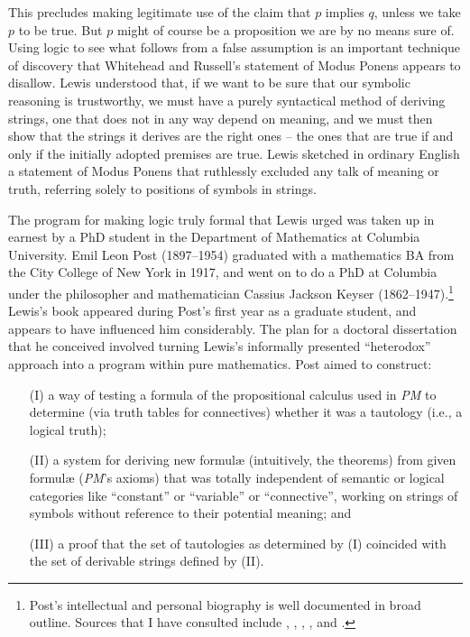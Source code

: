 \documentclass[output=paper]{langscibook}
\begin{document}
This precludes making legitimate use of the claim that $p$ implies $q$, unless we take $p$ to be true.  But $p$ might of course be a proposition we are by no means sure of.  Using logic to see what follows from a false assumption is an important technique of discovery that Whitehead and Russell's statement of Modus Ponens appears to disallow. Lewis understood that, if we want to be sure that our symbolic reasoning is trustworthy, we must have a purely syntactical method of deriving strings, one that does not in any way depend on meaning, and we must then show that the strings it derives are the right ones – the ones that are true if and only if the initially adopted premises are true. Lewis sketched in ordinary English a statement of Modus Ponens that ruthlessly excluded any talk of meaning or truth, referring solely to positions of symbols in strings.

The program for making logic truly formal that Lewis urged was taken up in earnest by a PhD student in the Department of Mathematics at Columbia University. Emil Leon Post (1897--1954) graduated with a mathematics BA from the City College of New York in 1917, and went on to do a PhD at Columbia under the philosopher and mathematician Cassius Jackson Keyser (1862--1947).\footnote{Post's intellectual and personal biography is well documented in broad outline. Sources that I have consulted include \citet{Davis94}, \citet{Stillwell04}, \citet{DeMol06}, \citet{Urquhart09}, and \citet{Jackson18}.} Lewis's book appeared during Post's first year as a graduate student, and appears to have influenced him considerably. The plan for a doctoral dissertation that he conceived involved turning Lewis's informally presented ``heterodox'' approach into a program within pure mathematics. Post aimed to construct:

\begin{itemize}
\item[(I)]   a way of testing a formula of the propositional calculus used in \textit{PM} to determine (via truth tables for connectives) whether it was a tautology (i.e., a logical truth); 
\item[(II)]  a system for deriving new formul{\ae} (intuitively, the theorems) from given formul{\ae} (\textit{PM}'s axioms) that was totally independent of semantic or logical categories like ``constant'' or ``variable'' or ``connective'', working on strings of symbols without reference to their potential meaning; and 
\item[(III)] a proof that the set of tautologies as determined by (I) coincided with the set of derivable strings defined by (II).
\end{itemize} 
\end{document}
